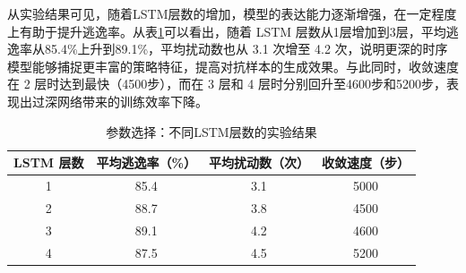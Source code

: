 
从实验结果可见，随着LSTM层数的增加，模型的表达能力逐渐增强，在一定程度上有助于提升逃逸率。从表\ref{tab:5.6}可以看出，随着 LSTM 层数从1层增加到3层，平均逃逸率从85.4\%上升到89.1\%，平均扰动数也从 3.1 次增至 4.2 次，说明更深的时序模型能够捕捉更丰富的策略特征，提高对抗样本的生成效果。与此同时，收敛速度在 2 层时达到最快（4500步），而在 3 层和 4 层时分别回升至4600步和5200步，表现出过深网络带来的训练效率下降。


\begin{table}[htbp]
	\centering
	\caption{参数选择：不同LSTM层数的实验结果}
	\label{tab:5.6}
	\begin{tabular*}{0.9\textwidth}{@{\extracolsep{\fill}}cccc}
		\toprule
		LSTM 层数 & 平均逃逸率（\%） & 平均扰动数（次） & 收敛速度（步） \\
		\midrule
		1 & 85.4 & 3.1 & 5000 \\
		2 & 88.7 & 3.8 & 4500 \\
		3 & 89.1 & 4.2 & 4600 \\
		4 & 87.5 & 4.5 & 5200 \\
		\bottomrule
	\end{tabular*}
\end{table}

